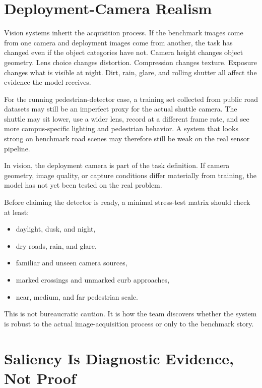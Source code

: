 \section{Deployment-Camera Realism}

Vision systems inherit the acquisition process. If the benchmark images come from one camera and deployment images come from another, the task has changed even if the object categories have not. Camera height changes object geometry. Lens choice changes distortion. Compression changes texture. Exposure changes what is visible at night. Dirt, rain, glare, and rolling shutter all affect the evidence the model receives.

For the running pedestrian-detector case, a training set collected from public road datasets may still be an imperfect proxy for the actual shuttle camera. The shuttle may sit lower, use a wider lens, record at a different frame rate, and see more campus-specific lighting and pedestrian behavior. A system that looks strong on benchmark road scenes may therefore still be weak on the real sensor pipeline.

\begin{decisionbox}
In vision, the deployment camera is part of the task definition. If camera geometry, image quality, or capture conditions differ materially from training, the model has not yet been tested on the real problem.
\end{decisionbox}

Before claiming the detector is ready, a minimal stress-test matrix should check at least:
\begin{itemize}[leftmargin=*]
\item daylight, dusk, and night,
\item dry roads, rain, and glare,
\item familiar and unseen camera sources,
\item marked crossings and unmarked curb approaches,
\item near, medium, and far pedestrian scale.
\end{itemize}

This is not bureaucratic caution. It is how the team discovers whether the system is robust to the actual image-acquisition process or only to the benchmark story.

\section{Saliency Is Diagnostic Evidence, Not Proof}

